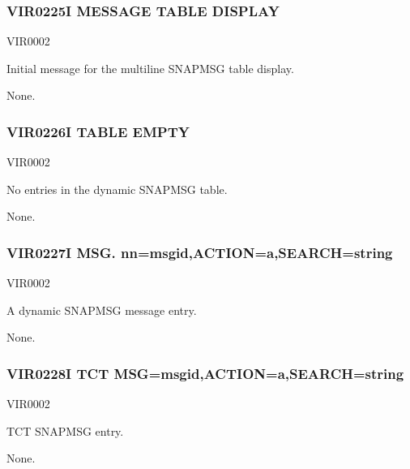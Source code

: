 \documentclass[letterpaper,10pt,english]{sphinxmanual}
\begin{document}
\subsubsection{VIR0225I MESSAGE TABLE DISPLAY}
\label{\detokenize{messages:vir0225i-message-table-display}}\begin{description}
\sphinxAtStartPar
VIR0002

\sphinxAtStartPar
Initial message for the multiline SNAPMSG table display.

\sphinxAtStartPar
None.

\end{description}


\subsubsection{VIR0226I TABLE EMPTY}
\label{\detokenize{messages:vir0226i-table-empty}}\begin{description}
\sphinxAtStartPar
VIR0002

\sphinxAtStartPar
No entries in the dynamic SNAPMSG table.

\sphinxAtStartPar
None.

\end{description}


\subsubsection{VIR0227I MSG. nn=msgid,ACTION=a,SEARCH=string}
\label{\detokenize{messages:vir0227i-msg-nn-msgid-action-a-search-string}}\begin{description}
\sphinxAtStartPar
VIR0002

\sphinxAtStartPar
A dynamic SNAPMSG message entry.

\sphinxAtStartPar
None.

\end{description}


\subsubsection{VIR0228I TCT MSG=msgid,ACTION=a,SEARCH=string}
\label{\detokenize{messages:vir0228i-tct-msg-msgid-action-a-search-string}}\begin{description}
\sphinxAtStartPar
VIR0002

\sphinxAtStartPar
TCT SNAPMSG entry.

\sphinxAtStartPar
None.

\end{description}
\end{document}
